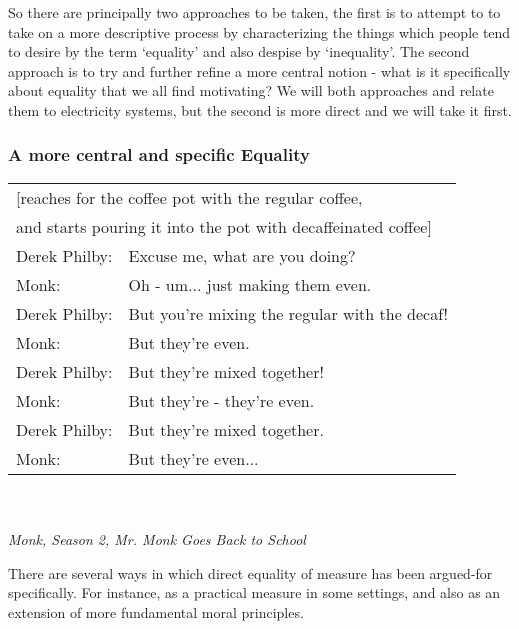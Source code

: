 \documentclass{article}
\begin{document}
So there are principally two approaches to be taken, the first is to attempt to to take on a more descriptive process by characterizing the things which people tend to desire by the term `equality' and also despise by `inequality'.
The second approach is to try and further refine a more central notion - what is it specifically about equality that we all find motivating?
We will both approaches and relate them to electricity systems, but the second is more direct and we will take it first.

\subsubsection{A more central and specific Equality}

\begin{displayquote}
\begin{tabular}{ll}
\multicolumn{2}{l}{[reaches for the coffee pot with the regular coffee,} \\
\multicolumn{2}{l}{\-\hspace{5mm}and starts pouring it into the pot with decaffeinated coffee]} \\
Derek Philby:  & Excuse me, what are you doing?\\
Monk:  & Oh - um... just making them even.\\
Derek Philby:  & But you're mixing the regular with the decaf!\\
Monk:  & But they're even.\\
Derek Philby:  & But they're mixed together!\\
Monk:  & But they're - they're even.\\
Derek Philby:  & But they're mixed together.\\
Monk:  & But they're even...\\
\end{tabular}\\
\vspace{-0.5mm}\\
\null\hfill\textit{Monk, Season 2, Mr. Monk Goes Back to School}
\end{displayquote}

There are several ways in which direct equality of measure has been argued-for specifically.
For instance, as a practical measure in some settings, and also as an extension of more fundamental moral principles.
\end{document}
